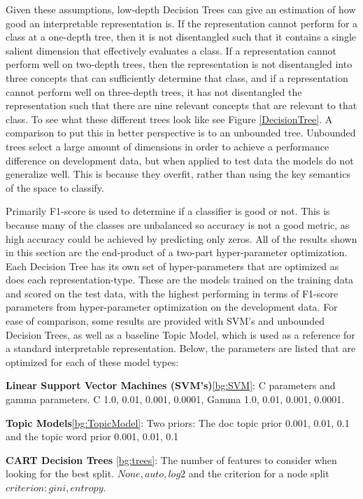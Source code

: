Given these assumptions, low-depth Decision Trees can give an estimation of how good an interpretable representation is. If the representation cannot perform for a class at a one-depth tree, then it is not disentangled such that it contains a single salient dimension that effectively evaluates a class. If a representation cannot perform well on two-depth trees, then the representation is not disentangled into three concepts that can sufficiently determine that class, and if a representation cannot perform well on three-depth trees, it has not disentangled the representation such that there are nine relevant concepts that are relevant to that class. To see what these different trees look like see Figure \ref{DecisionTree}. A comparison to put this in better perspective is to an unbounded tree. Unbounded trees select a large amount of dimensions in order to achieve a performance difference on development data, but when applied to test data the models do not generalize well. This is because they overfit, rather than using the key semantics of the space to classify.



Primarily F1-score  is used to determine if a classifier is good or not. This is because many of the classes are unbalanced so accuracy is not a good metric, as high accuracy could be achieved by predicting only zeros.  All of the results shown in this section are the end-product of a two-part hyper-parameter optimization. Each Decision Tree has its own set of hyper-parameters that are optimized as does each representation-type. These are the models trained on the training data and scored on the test data, with the highest performing in terms of F1-score parameters from hyper-parameter optimization on the development data. For ease of comparison, some results are provided with SVM's and unbounded Decision Trees, as well as a baseline Topic Model, which is used as a reference for a standard interpretable representation. Below, the parameters are listed that are optimized for each of these model types:

\textbf{Linear Support Vector Machines (SVM's)}\ref{bg:SVM}: C parameters and gamma parameters.
C {1.0, 0.01, 0.001, 0.0001}, Gamma {1.0, 0.01, 0.001, 0.0001}.

\textbf{Topic Models}\ref{bg:TopicModel}: Two priors: The doc topic prior {0.001, 0.01, 0.1} and the topic word prior {0.001, 0.01, 0.1}

\textbf{CART Decision Trees }\ref{bg:trees}: The number of features to consider when looking for the best split. $None, auto, log2$ and the criterion for a node split $criterion: gini, entropy$.
	
